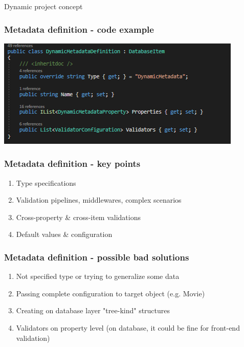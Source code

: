 \documentclass{beamer}
\begin{document}
\begin{section}{Dynamic project concept}
\begin{frame}
\end{frame}

\begin{frame}
\frametitle{Metadata definition - code example \footnotemark[1]}

 \includegraphics{DynamicMetadataDefinition.png}


\end{frame}

\begin{frame}
\frametitle{Metadata definition - key points}

\begin{enumerate}
	\item Type specifications
	\item Validation pipelines, middlewares, complex scenarios
	\item Cross-property \& cross-item validations
	\item Default values \& configuration
\end{enumerate}

\end{frame}

\begin{frame}
\frametitle{Metadata definition - possible bad solutions}

\begin{enumerate}
	\item Not specified type or trying to generalize some data
	\item Passing complete configuration to target object (e.g. Movie)
	\item Creating on database layer "tree-kind" structures
	\item Validators on property level (on database, it could be fine for front-end validation)
\end{enumerate}


\end{frame}
\end{section}
\end{document}
